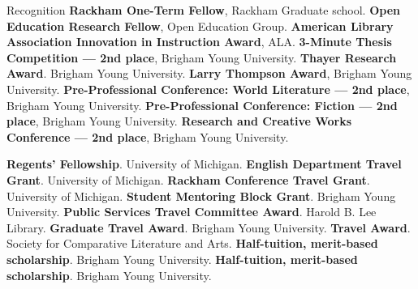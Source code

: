 \begin{rubric}{Recognition}
\entry*[2022] \textbf{Rackham One-Term Fellow}, Rackham Graduate school.
\entry*[2021] \textbf{Open Education Research Fellow}, Open Education Group.
\entry*[2018] \textbf{American Library Association Innovation in Instruction Award}, ALA.
\entry*[2018] \textbf{3-Minute Thesis Competition — 2nd place}, Brigham Young University.
\entry*[2017] \textbf{Thayer Research Award}. Brigham Young University.
\entry*[2015] \textbf{Larry Thompson Award}, Brigham Young University.
\entry*[2015] \textbf{Pre-Professional Conference: World Literature — 2nd place}, Brigham Young University.
\entry*[2015] \textbf{Pre-Professional Conference: Fiction — 2nd place}, Brigham Young University.
\entry*[2014] \textbf{Research and Creative Works Conference — 2nd place}, Brigham Young University.

\entry*[2023] \textbf{Regents' Fellowship}. University of Michigan.
\entry*[2022] \textbf{English Department Travel Grant}. University of Michigan.
\entry*[2020] \textbf{Rackham Conference Travel Grant}. University of Michigan.
\entry*[2019] \textbf{Student Mentoring Block Grant}. Brigham Young University.
\entry*[2018] \textbf{Public Services Travel Committee Award}. Harold B. Lee Library.
\entry*[2017] \textbf{Graduate Travel Award}. Brigham Young University.
\entry*[2017] \textbf{Travel Award}. Society for Comparative Literature and Arts.
\entry*[2017] \textbf{Half-tuition, merit-based scholarship}. Brigham Young University.
\entry*[2015] \textbf{Half-tuition, merit-based scholarship}. Brigham Young University.

\end{rubric}